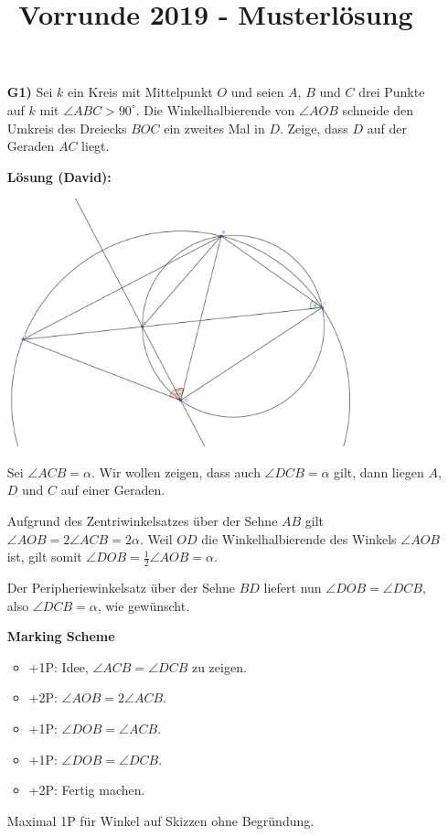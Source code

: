 \documentclass[language=german,style=solution]{smo}
\title{Vorrunde 2019 - Musterlösung}
\begin{document}
\begin{enumerate}

\item[\textbf{G1)}]
Sei $k$ ein Kreis mit Mittelpunkt $O$ und seien $A$, $B$ und $C$ drei Punkte auf $k$ mit $\angle ABC > 90^\circ$. Die Winkelhalbierende von $\angle AOB$ schneide den Umkreis des Dreiecks $BOC$ ein zweites Mal in $D$. Zeige, dass $D$ auf der Geraden $AC$ liegt.

\textbf{Lösung (David):}
\begin{center}
\includegraphics[width=0.8\textwidth]{Vorrunde_2019_G1.png}
\end{center}
\vspace{1cm}
Sei $\angle ACB = \alpha$. Wir wollen zeigen, dass auch $\angle DCB = \alpha$ gilt, dann liegen $A$, $D$ und $C$ auf einer Geraden.

Aufgrund des Zentriwinkelsatzes über der Sehne $AB$ gilt $\angle AOB = 2 \angle ACB = 2 \alpha$. Weil $OD$ die Winkelhalbierende des Winkels $\angle AOB$ ist, gilt somit $\angle DOB = \frac{1}{2} \angle AOB = \alpha$. 

Der Peripheriewinkelsatz über der Sehne $BD$ liefert nun $\angle DOB = \angle DCB$, also $\angle DCB = \alpha$, wie gewünscht.

\textbf{Marking Scheme}
\begin{itemize}
\item +1P: Idee, $\angle ACB = \angle DCB$ zu zeigen.
\item +2P: $\angle AOB = 2 \angle ACB$.
\item +1P: $\angle DOB = \angle ACB$.
\item +1P: $\angle DOB = \angle DCB$.
\item +2P: Fertig machen.
\end{itemize}
Maximal 1P für Winkel auf Skizzen ohne Begründung.


\end{enumerate}
\end{document}
